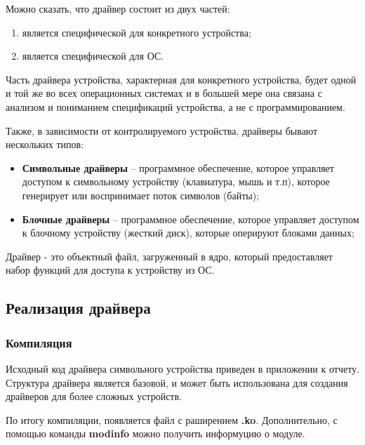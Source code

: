 Можно сказать, что драйвер состоит из двух частей:
\begin{enumerate}
\item является специфической для конкретного устройства;
\item является специфической для ОС.
\end{enumerate}
Часть драйвера устройства, характерная для конкретного устройства, будет одной и той же во всех операционных системах и в большей мере она связана с анализом и пониманием спецификаций устройства, а не с программированием. 

Также, в зависимости от контролируемого устройства, драйверы бывают нескольких типов:
\begin{itemize}
\item \textbf{Символьные драйверы} – программное обеспечение, которое управляет доступом к символьному устройству (клавиатура, мышь и т.п), которое генерирует или воспринимает поток символов (байты);
\item \textbf{Блочные драйверы} – программное обеспечение, которое управляет доступом к блочному устройству (жесткий диск), которые оперируют блоками данных;
\end{itemize}

\par Драйвер - это объектный файл, загруженный в ядро, который предоставляет набор функций для доступа к устройству из ОС. 

\subsection{Реализация драйвера}

\subsubsection{Компиляция}
\par Исходный код драйвера символьного устройства приведен в приложении к отчету. Структура драйвера является базовой, и может быть использована для создания драйверов для более сложных устройств.



\par По итогу компиляции, появляется файл с раширением \textbf{.ko}. Дополнительно, с помощью команды \textbf{modinfo} можно получить информуцию о модуле.



